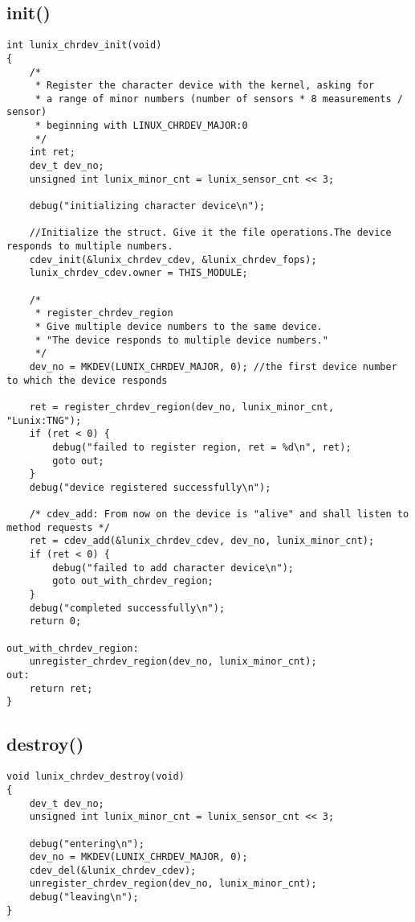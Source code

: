 \documentclass[a4paper]{article}
\begin{document}
\subsection*{init()}
\label{sec:init}
\begin{lstlisting}[style=CStyle]
int lunix_chrdev_init(void)
{
	/*
	 * Register the character device with the kernel, asking for
	 * a range of minor numbers (number of sensors * 8 measurements / sensor)
	 * beginning with LINUX_CHRDEV_MAJOR:0
	 */
	int ret;
	dev_t dev_no;
	unsigned int lunix_minor_cnt = lunix_sensor_cnt << 3; 

	debug("initializing character device\n");

    //Initialize the struct. Give it the file operations.The device responds to multiple numbers.
	cdev_init(&lunix_chrdev_cdev, &lunix_chrdev_fops);
	lunix_chrdev_cdev.owner = THIS_MODULE;

    /*
     * register_chrdev_region
     * Give multiple device numbers to the same device.
     * "The device responds to multiple device numbers."
     */
	dev_no = MKDEV(LUNIX_CHRDEV_MAJOR, 0); //the first device number to which the device responds

    ret = register_chrdev_region(dev_no, lunix_minor_cnt, "Lunix:TNG");
	if (ret < 0) {
		debug("failed to register region, ret = %d\n", ret);
		goto out;
	}
    debug("device registered successfully\n");

    /* cdev_add: From now on the device is "alive" and shall listen to method requests */
    ret = cdev_add(&lunix_chrdev_cdev, dev_no, lunix_minor_cnt);
	if (ret < 0) {
		debug("failed to add character device\n");
		goto out_with_chrdev_region;
	}
	debug("completed successfully\n");
	return 0;

out_with_chrdev_region:
	unregister_chrdev_region(dev_no, lunix_minor_cnt);
out:
	return ret;
}
\end{lstlisting}

\subsection*{destroy()}
\label{sec:destroy}
\begin{lstlisting}[style=CStyle]
void lunix_chrdev_destroy(void)
{
	dev_t dev_no;
	unsigned int lunix_minor_cnt = lunix_sensor_cnt << 3;

	debug("entering\n");
	dev_no = MKDEV(LUNIX_CHRDEV_MAJOR, 0);
	cdev_del(&lunix_chrdev_cdev);
	unregister_chrdev_region(dev_no, lunix_minor_cnt);
	debug("leaving\n");
}
\end{lstlisting}
\end{document}
